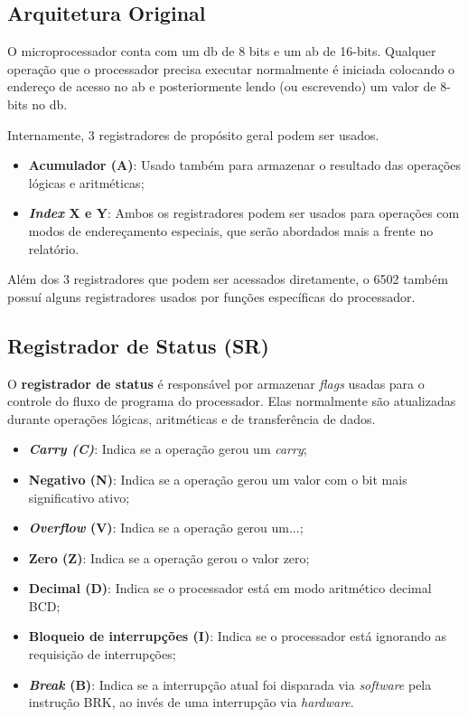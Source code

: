 \documentclass[
	12pt,				  %
	openright,		%
	a4paper,			%
	english,			%
	french,				%
	spanish,			%
	brazil,				%
]{abntex2}
\begin{document}
\subsection{Arquitetura Original}
O microprocessador conta com um \acrfull{db} de 8 bits e um \acrfull{ab} de
16-bits. Qualquer operação que o processador precisa executar normalmente é
iniciada colocando o endereço de acesso no \acrshort{ab} e posteriormente lendo
(ou escrevendo) um valor de 8-bits no \acrshort{db}.

Internamente, 3 registradores de propósito geral podem ser usados.
\begin{itemize}
	\item \textbf{Acumulador (A)}: Usado também para armazenar o resultado das
	      operações lógicas e aritméticas;
	\item \textbf{\emph{Index} X e Y}: Ambos os registradores podem ser usados
	      para operações com modos de endereçamento especiais, que serão abordados
	      mais a frente no relatório.
\end{itemize}

Além dos 3 registradores que podem ser acessados diretamente, o 6502 também
possuí alguns registradores usados por funções específicas do processador.

\subsection{Registrador de Status (SR)}

O \textbf{registrador de status} é responsável por armazenar \emph{flags} usadas
para o controle do fluxo de programa do processador. Elas normalmente são
atualizadas durante operações lógicas, aritméticas e de transferência de dados.
\begin{itemize}
	\item \textbf{\emph{Carry (C)}}: Indica se a operação gerou um \emph{carry};
	\item \textbf{Negativo (N)}: Indica se a operação gerou um valor com o bit
	      mais significativo ativo;
	\item \textbf{\emph{Overflow} (V)}: Indica se a operação gerou um...;
	\item \textbf{Zero (Z)}: Indica se a operação gerou o valor zero;
	\item \textbf{Decimal (D)}: Indica se o processador está em modo aritmético
	      decimal BCD;
	\item \textbf{Bloqueio de interrupções (I)}: Indica se o processador está
	      ignorando as requisição de interrupções;
	\item \textbf{\emph{Break} (B)}: Indica se a interrupção atual foi disparada
	      via \emph{software} pela instrução BRK, ao invés de uma interrupção via
	      \emph{hardware}.
\end{itemize}
\end{document}

